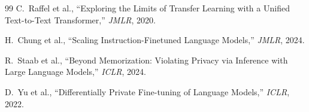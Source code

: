 \documentclass[11pt, a4paper]{article}
\begin{document}
\begin{thebibliography}{99}
C.~Raffel et al., ``Exploring the Limits of Transfer Learning with a
Unified Text-to-Text Transformer,'' \textit{JMLR}, 2020.

H.~Chung et al., ``Scaling Instruction-Finetuned Language Models,''
\textit{JMLR}, 2024.

R.~Staab et al., ``Beyond Memorization: Violating Privacy via Inference
with Large Language Models,'' \textit{ICLR}, 2024.

D.~Yu et al., ``Differentially Private Fine-tuning of Language Models,''
\textit{ICLR}, 2022.

\end{thebibliography}
\end{document}
